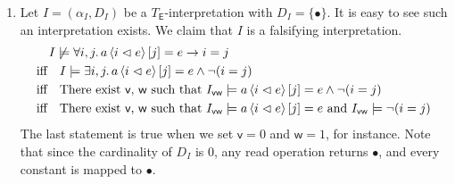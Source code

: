 \begin{exer}[3.4]
    $ $
    \begin{enumerate}[label=(\alph*)]
        \item
            Let $I = (\alpha_I, D_I)$ be a $T_{\textsf{E}}$-interpretation with $D_I = \{ \bullet \}$.
            It is easy to see such an interpretation exists.
            We claim that $I$ is a falsifying interpretation.
            \begin{align*}
                &\quad I \not\models \forall i, j.\, a\ev{i \vartriangleleft e}[j] = e \rightarrow i = j \\
                &\text{iff}\quad I \models \exists i, j.\, a\ev{i \vartriangleleft e}[j] = e \land \neg(i = j) \\
                &\text{iff}\quad \text{There exist \textsf{v}, \textsf{w} such that } I_{\textsf{vw}} \models a\ev{i \vartriangleleft e}[j] = e \land \neg(i = j) \\
                &\text{iff}\quad \text{There exist \textsf{v}, \textsf{w} such that } I_{\textsf{vw}} \models a\ev{i \vartriangleleft e}[j] = e \text{ and } I_{\textsf{vw}} \models \neg(i = j) \\
            \end{align*}
            The last statement is true when we set $\textsf{v} = 0$ and $\textsf{w} = 1$, for instance.
            Note that since the cardinality of $D_I$ is 0, any \textsf{read} operation returns $\bullet$, and every constant is mapped to $\bullet$.
    \end{enumerate}
\end{exer}

